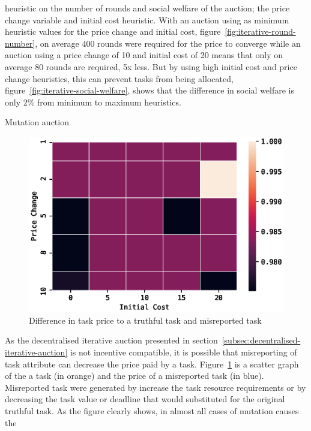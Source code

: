 heuristic on the number of rounds and social welfare of the auction; the price change variable and initial cost
heuristic. With an auction using as minimum heuristic values for the price change and initial cost,
figure~\ref{fig:iterative-round-number}, on average 400 rounds were required for the price to converge while an auction
using a price change of 10 and initial cost of 20 means that only on average 80 rounds are required, 5x less. But by
using high initial cost and price change heuristics, this can prevent tasks from being allocated,
figure~\ref{fig:iterative-social-welfare}, shows that the difference in social welfare is only 2\% from minimum to
maximum heuristics.

Mutation auction
\begin{figure}
    \centering
    \includegraphics[width=\linewidth]{figs/empirical_evidence/iterative_round_number}  %
    \caption{Difference in task price to a truthful task and misreported task}
    \label{fig:auction-mutation}
\end{figure}
As the decentralised iterative auction presented in section~\ref{subsec:decentralised-iterative-auction} is not
incentive compatible, it is possible that misreporting of task attribute can decrease the price paid by a task.
Figure~\ref{fig:auction-mutation} is a scatter graph of the a task (in orange) and the price of a misreported task
(in blue). Misreported task were generated by increase the task resource requirements or by decreasing the task value
or deadline that would substituted for the original truthful task. As the figure clearly shows, in almost all cases of
mutation causes the